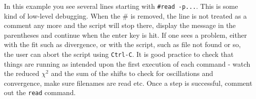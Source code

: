 In this example you see several lines starting with \texttt{\#read -p...}. This is some kind of low-level debugging. When the \# is removed, the line is not treated as a comment any more and the script will stop there, display the message in the parentheses and continue when the enter key is hit. If one sees a problem, either with the fit such as divergence, or with the script, such as file not found or so, the user can abort the script using \texttt{Ctrl-C}. It is good practice to check that things are running as intended upon the first execution of each command - watch the reduced $\chi^2$ and the sum of the shifts to check for oscillations and convergence, make sure filenames are read etc. Once a step is successful, comment out the \texttt{read} command.
